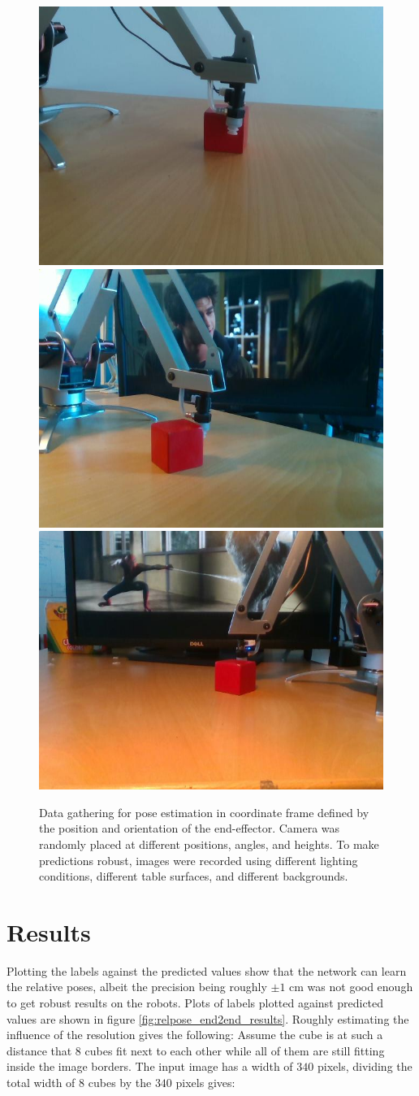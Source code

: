 \begin{figure}[ht!]
    \centering
    \includegraphics[width=0.3 \textwidth]{res/spiderman1.jpg}
    \includegraphics[width=0.3 \textwidth]{res/spiderman2.jpg}
    \includegraphics[width=0.3 \textwidth]{res/spiderman3.jpg}

    \caption{Data gathering for pose estimation in coordinate frame defined by
    the position and orientation of the end-effector. Camera was randomly
    placed at different positions, angles, and heights. To make predictions
    robust, images were recorded using different lighting conditions, different
    table surfaces, and different backgrounds.}

    \label{fig:relpose-training-data}
    
\end{figure}

\section{Results}

Plotting the labels against the predicted values show that the network can
learn the relative poses, albeit the precision being roughly $\pm 1$ cm was not
good enough to get robust results on the robots. Plots of labels plotted
against predicted values are shown in figure \ref{fig:relpose_end2end_results}.
Roughly estimating the influence of the resolution gives the following: Assume
the cube is at such a distance that $8$ cubes fit next to each other while all
of them are still fitting inside the image borders. The input image has a width
of $340$ pixels, dividing the total width of $8$ cubes by the $340$ pixels
gives:

